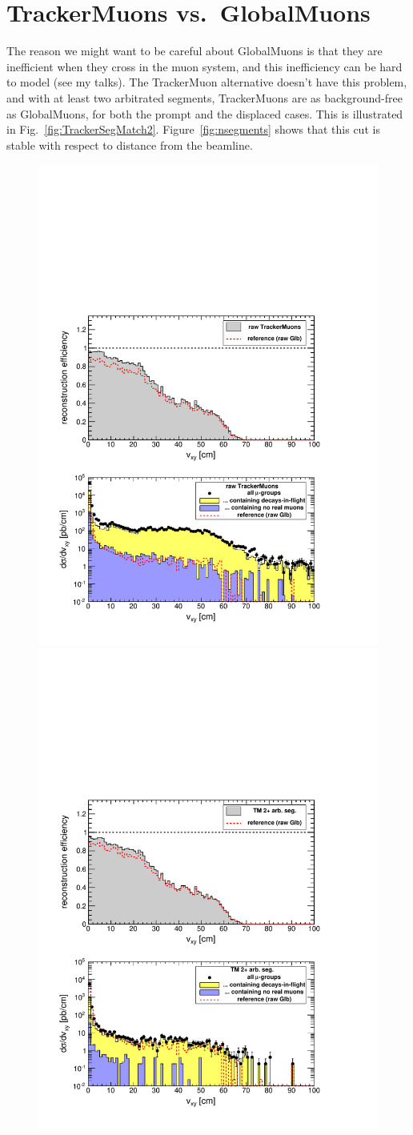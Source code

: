 \documentclass[12pt]{article}
\begin{document}
\section{TrackerMuons vs.\ GlobalMuons}

The reason we might want to be careful about GlobalMuons is that they
are inefficient when they cross in the muon system, and this
inefficiency can be hard to model (see my talks).  The TrackerMuon
alternative doesn't have this problem, and with at least two
arbitrated segments, TrackerMuons are as background-free as
GlobalMuons, for both the prompt and the displaced cases.  This is
illustrated in Fig.~\ref{fig:TrackerSegMatch2}.
Figure~\ref{fig:nsegments} shows that this cut is stable with respect
to distance from the beamline.

\begin{figure}
\includegraphics[width=0.49\linewidth]{fig/backgrounds3_plot/dispvert_Tracker.pdf}
\includegraphics[width=0.49\linewidth]{fig/backgrounds3_plot/dispvert_TrackerSegMatch2.pdf}


\end{figure}
\end{document}
